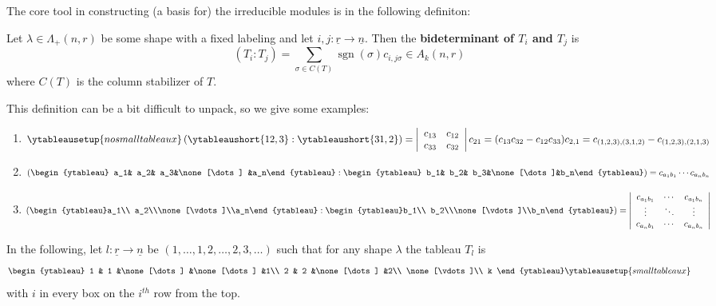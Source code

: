 \documentclass[12pt]{article}
\begin{document}
The core tool in constructing (a basis for) the irreducible modules is in the following definiton:
\begin{defn}
	Let $\lambda\in\Lambda_+(n,r)$ be some shape with a fixed labeling and let $i,j:\underline r\to\underline n$. Then the \textbf{bideterminant of $T_i$ and $T_j$}
	is 
	\[(T_i:T_j)=\sum_{\sigma\in C(T)}\operatorname{sgn}(\sigma)c_{i,j\sigma}\in A_k(n,r)\]
	where $C(T)$ is the column stabilizer of $T$.
\end{defn}
This definition can be a bit difficult to unpack, so we give some examples:
\begin{ex}
	\begin{enumerate}
		\item \[\ytableausetup{nosmalltableaux}\left(\ytableaushort{1 2,3}:\ytableaushort{3 1,2}\right)=\left|\begin{array}{cc}
			c_{13} & c_{12}\\ c_{33} & c_{32}
		\end{array}\right|c_{21}=(c_{13}c_{32}-c_{12}c_{33})c_{2,1}=c_{(1,2,3),(3,1,2)}-c_{(1,2,3),(2,1,3)}\]
		\item \[\left(\begin{ytableau} a_1& a_2& a_3&\none[\dots] &a_n\end{ytableau}:
		\begin{ytableau} b_1& b_2& b_3&\none[\dots]&b_n\end{ytableau}\right)=c_{a_1b_1}\cdots c_{a_nb_n}\]
		\item \[\left(\begin{ytableau}a_1\\ a_2\\\none[\vdots]\\a_n\end{ytableau}:\begin{ytableau}b_1\\ b_2\\\none[\vdots]\\b_n\end{ytableau}\right)=
			\left|\begin{array}{ccc}c_{a_1b_1} & \cdots & c_{a_1b_n}\\
			\vdots & \ddots & \vdots\\
			c_{a_nb_1} & \cdots & c_{a_nb_n}
			\end{array}\right|\]
	\end{enumerate}
\end{ex}

In the following, let $l:\underline r\to\underline n$ be $(1,\dots,1,2,\dots,2,3,\dots)$ such that for any shape $\lambda$ the 
tableau $T_l$ is 
\[\begin{ytableau}
	1 & 1 &\none[\dots] &\none[\dots] &1\\
	2 & 2 &\none[\dots] &2\\
	\none[\vdots]\\
	k
\end{ytableau}\ytableausetup{smalltableaux}\]
with $i$ in every box on the $i^{th}$ row from the top.
\end{document}
